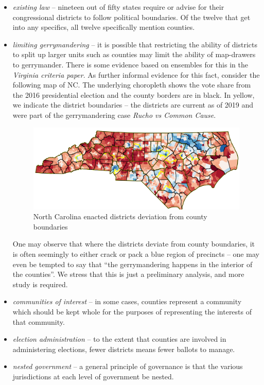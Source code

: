 \documentclass{mgggarticle}
\begin{document}
\begin{itemize}
\item \emph{existing law} -- nineteen out of fifty states require or advise for their congressional districts to follow political boundaries. Of the twelve that get into any specifics, all twelve specifically mention counties.

\item \emph{limiting gerrymandering} -- it is possible that restricting the ability of districts to split up larger units such as counties may limit the ability of map-drawers to gerrymander.  There is some evidence based on ensembles for this in the \emph{Virginia criteria paper}. As further informal evidence for this fact, consider the following map of NC. The underlying choropleth shows the vote share from the 2016 presidential election and the county borders are in black. In yellow, we indicate the district boundaries -- the districts are current as of 2019 and were part of the gerrymandering case \emph{Rucho vs Common Cause}. 
\begin{figure}[h]
\centering
\includegraphics[width=\textwidth]{NC_counties.png}
\caption{North Carolina enacted districts deviation from county boundaries}
\end{figure}
One may observe that where the districts deviate from county boundaries, it is often seemingly to either crack or pack a blue region of precincts -- one may even be tempted to say that ``the gerrymandering happens in the interior of the counties''. We stress that this is just a preliminary analysis, and more study is required.

\item \emph{communities of interest} -- in some cases, counties represent a community which should be kept whole for the purposes of representing the interests of that community. 

\item \emph{election administration} -- to the extent that counties are involved in administering elections, fewer districts means fewer ballots to manage.

\item \emph{nested government} -- a general principle of governance is that the various jurisdictions at each level of government be nested.
\end{itemize}
 
\end{document}
